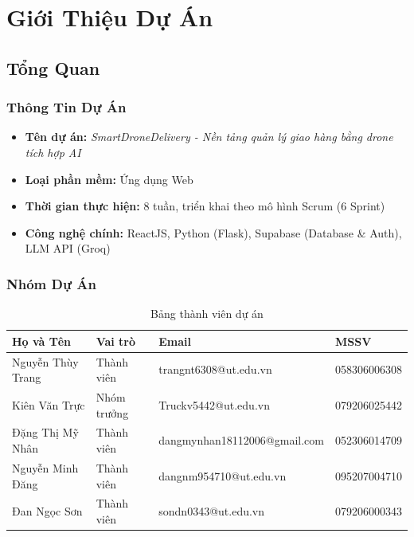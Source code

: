 \chapter{Giới Thiệu Dự Án}

\section{Tổng Quan}

\subsection{Thông Tin Dự Án}

\begin{itemize}
  \item \textbf{Tên dự án:} \textit{SmartDroneDelivery - Nền tảng quản lý giao hàng bằng drone tích hợp AI}
  \item \textbf{Loại phần mềm:} Ứng dụng Web
  \item \textbf{Thời gian thực hiện:} 8 tuần, triển khai theo mô hình Scrum (6 Sprint)
  \item \textbf{Công nghệ chính:} ReactJS, Python (Flask), Supabase (Database \& Auth), LLM API (Groq)
\end{itemize}

\subsection{Nhóm Dự Án}

\begin{table}[H]
  \centering
  \begin{tabularx}{\textwidth}{|l|l|X|l|}
    \hline
    \textbf{Họ và Tên} & \textbf{Vai trò} & \textbf{Email} & \textbf{MSSV} \\
    \hline
    Nguyễn Thùy Trang & Thành viên    & trangnt6308@ut.edu.vn & 058306006308 \\ \hline
    Kiên Văn Trực    & Nhóm trưởng    & Truckv5442@ut.edu.vn & 079206025442 \\ \hline
    Đặng Thị Mỹ Nhân & Thành viên     & dangmynhan18112006@gmail.com & 052306014709 \\ \hline
    Nguyễn Minh Đăng & Thành viên     & dangnm954710@ut.edu.vn & 095207004710 \\ \hline
    Đan Ngọc Sơn     & Thành viên     & sondn0343@ut.edu.vn & 079206000343 \\
    \hline
  \end{tabularx}
  \caption{Bảng thành viên dự án}
  \label{tab:team}
\end{table}


